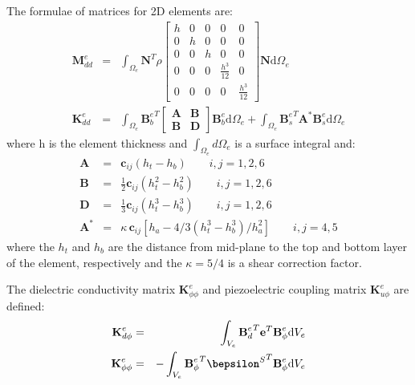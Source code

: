 \documentclass[a4paper,12pt]{article}
\newcommand{\rmd}{\mathrm{d}}
\begin{document}
The formulae of matrices for 2D elements are:
\begin{eqnarray}
\textbf{M}_{dd}^e & = & \int_{\Omega_e}\textbf{N}^T\rho 
\left [
\begin{array}{ccccc}
h & 0 & 0 & 0 & 0\\
0 & h & 0 & 0 & 0\\
0 & 0 & h & 0 & 0\\
0 & 0 & 0 & \frac{h^3}{12} & 0\\
0 & 0 & 0 & 0 & \frac{h^3}{12} 
\end{array} \right]
\textbf{N}\rmd \Omega_e\\
\textbf{K}_{dd}^e & = & \int_{\Omega_e}{\textbf{B}_b^e}^T
\left[
\begin{array}{cc}
\textbf{A} & \textbf{B}\\
\textbf{B} & \textbf{D}
\end{array} \right]
\textbf{B}_b^e\rmd \Omega_e+\int_{\Omega_e}{\textbf{B}_s^e}^T\textbf{A}^{\ast}\textbf{B}_s^e\rmd \Omega_e
\end{eqnarray}
where h is the element thickness and $\int_{\Omega_e}d\Omega_e$ is a surface integral and:
\begin{eqnarray}
\textbf{A} & = & \textbf{c}_{ij}(h_t-h_b)\qquad i,j=1,2,6\nonumber\\
\textbf{B} & = & \frac{1}{2}\textbf{c}_{ij}(h_t^2-h_b^2)\qquad i,j=1,2,6\nonumber\\
\textbf{D} & = & \frac{1}{3}\textbf{c}_{ij}(h_t^3-h_b^3)\qquad i,j=1,2,6\nonumber\\
\textbf{A}^{\ast} & = & \kappa \, \textbf{c}_{ij}\left[h_a-4/3\left(h_t^3-h_b^3\right)/h_a^2\right]\qquad i,j=4,5\nonumber
\end{eqnarray}
where the $h_t$ and $h_b$ are the distance from mid-plane to the top and bottom 
layer of the element, respectively and the $\kappa=5/4$ is a shear correction 
factor.

The dielectric conductivity matrix $\textbf{K}_{\phi \phi}^e$ and piezoelectric coupling matrix $\textbf{K}_{u \phi}^e$ are defined:
\begin{eqnarray}
\textbf{K}_{d\phi}^e & = & \int_{V_e}{\textbf{B}_d^e}^T\textbf{e}^T \textbf{B}_{\phi}^e\rmd V_e\\
\textbf{K}_{\phi \phi}^e & = & -\int_{V_e}{\textbf{B}_{\phi}^e}^T {\textbf{$\bepsilon$}^S}^T \textbf{B}_{\phi}^e\rmd V_e
\end{eqnarray}


\section{}
\label{app:properties}
\end{document}
